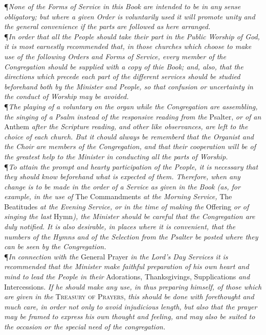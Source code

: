 \P \textit{None of the Forms of Service in this Book are intended to be in any sense obligatory; but where a given Order is voluntarily used it will promote unity and the general convenience if the parts are followed as here arranged.} \\

\noindent\P \textit{In order that all the People should take their part in the Public Worship of God, it is most earnestly recommended that, in those churches which choose to make use of the following Orders and Forms of Service, every member of the Congregation should be supplied with a copy of thie Book; and, also, that the directions which precede each part of the different services should be studied beforehand both by the Minister and People, so that confusion or uncertainty in the conduct of Worship may be avoided.} \\

\noindent\P \textit{The playing of a voluntary on the organ while the Congregation are assembling, the singing of a Psalm instead of the responsive reading from the} Psalter, \textit{or of an} Anthem \textit{after the Scripture reading, and other like observances, are left to the choice of each church.
But it chould always be rememberd that the Organist and the Choir are members of the Congregation, and that their cooperation will be of the greatest help to the Minister in conducting all the parts of Worship.} \\

\noindent\P \textit{To attain the prompt and hearty participation of the People, it is necessary that they should know beforehand what is expected of them.
Therefore, when any change is to be made in the order of a Service as given in the Book (as, for example, in the use of} The Commandments \textit{at the Morning Service,} The Beatitudes \textit{at the Evening Service, or in the time of making the} Offering \textit{or of singing the last} Hymn\textit{), the Minister should be careful that the Congregation are duly notified.
It is also desirable, in places where it is convenient, that the numbers of the Hymns and of the Selection from the Psalter be posted where they can be seen by the Congregation.} \\

\noindent\P \textit{In connection with the} General Prayer \textit{in the Lord's Day Services it is recommended that the Minister make faithful preparation of his own heart and mind to lead the People in their} Adorations, Thanksgivings, Supplications \textit{and} Intercessions.
\textit{If he should make any use, in thus preparing himself, of those which are given in the} \textsc{Treasury of Prayers,} \textit{this should be done with forethought and much care, in order not only to avoid injudicious length, but also that the prayer may be framed to express his own thought and feeling, and may also be suited to the occasion or the special need of the congregation.} \\

